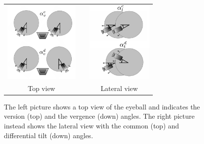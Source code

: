 \begin{figure}
  \begin{center}
	\begin{tabular}{ccc}
	  \parbox{40mm}{\includegraphics[height=40mm]{Figure/EyeVergenceVersion.eps}}  & \hspace{2cm} &
	  \parbox{40mm}{\includegraphics[height=40mm]{Figure/EyeCommDiffTilt.eps}}
	  \\
	  Top view & \hspace{2cm} & Lateral view
  \end{tabular}
\end{center}
\caption{The left picture shows a top view of the eyeball and indicates the version (top) and the vergence (down) angles. The right picture instead shows the lateral view with the common (top) and differential tilt (down) angles.}\label{Fig:EyeCoordinatedMovements}
  \end{figure}

